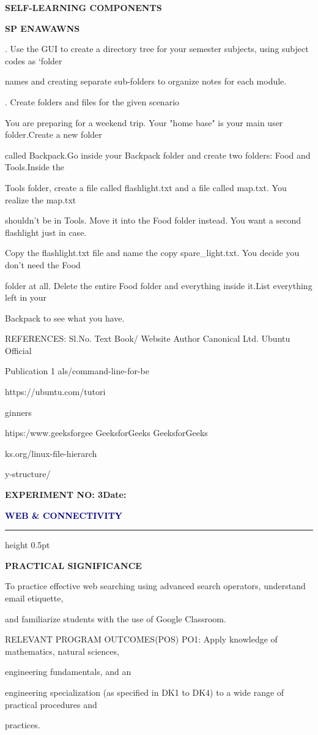 \documentclass[10pt,a4paper]{article}
\newcommand{\expheading}[2]{%
  \vspace{0.1cm}\noindent\textbf{\large EXPERIMENT NO: #1}\hfill\textbf{Date: #2}\par
}
\newcommand{\exptitle}[1]{%
  \begin{center}\vspace{-2mm}\textcolor{navy}{\fontsize{20}{22}\selectfont\bfseries #1}\end{center}
  \vspace{1mm}\hrule height 0.5pt\vspace{3mm}
}
\begin{document}
\medskip\noindent\textbf{SELF-LEARNING COMPONENTS}\par
\medskip\noindent\textbf{SP ENAWAWNS}\par
{}. Use the GUI to create a directory tree for your semester subjects, using subject codes as ‘folder\par
\noindent names and creating separate sub-folders to organize notes for each module.\par
{}. Create folders and files for the given scenario\par
\noindent You are preparing for a weekend trip. Your "home base" is your main user folder.Create a new folder\par
\noindent called Backpack.Go inside your Backpack folder and create two folders: Food and Tools.Inside the\par
\noindent Tools folder, create a file called flashlight.txt and a file called map.txt. You realize the map.txt\par
\noindent shouldn't be in Tools. Move it into the Food folder instead. You want a second flashlight just in case.\par
\noindent Copy the flashlight.txt file and name the copy spare\_light.txt. You decide you don't need the Food\par
\noindent folder at all. Delete the entire Food folder and everything inside it.List everything left in your\par
\noindent Backpack to see what you have.\par

\noindent REFERENCES: Sl.No.                     Text Book/ Website Author        Canonical Ltd. Ubuntu Official\par
\noindent Publication 1                    als/command-line-for-be\par
\noindent https://ubuntu.com/tutori\par

\noindent ginners\par

                           htips:/www.geeksforgee      GeeksforGeeks            GeeksforGeeks\par
\noindent ks.org/linux-file-hierarch\par
\noindent y-structure/\par
\clearpage
\expheading{3}{\underline{\hspace{1.8cm}}}
\exptitle{WEB \& CONNECTIVITY}
\medskip\noindent\textbf{PRACTICAL SIGNIFICANCE}\par
\noindent To practice effective web searching using advanced search operators, understand email etiquette,\par
\noindent and familiarize students with the use of Google Classroom.\par
\noindent RELEVANT PROGRAM OUTCOMES(POS) PO1: Apply knowledge of mathematics, natural sciences,\par
\noindent engineering fundamentals, and an\par
\noindent engineering specialization (as specified in DK1 to DK4) to a wide range of practical procedures and\par
\noindent practices.\par
\end{document}
